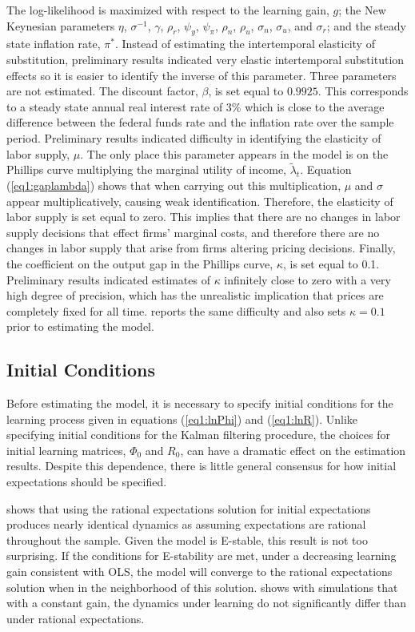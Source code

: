 The log-likelihood is maximized with respect to the learning gain, $g$; the New Keynesian parameters $\eta$, $\sigma^{-1}$, $\gamma$, $\rho_r$, $\psi_y$, $\psi_{\pi}$, $\rho_n$, $\rho_u$, $\sigma_n$, $\sigma_u$, and $\sigma_r$; and the steady state inflation rate, $\pi^*$.  Instead of estimating the intertemporal elasticity of substitution, preliminary results indicated very elastic intertemporal substitution effects so it is easier to identify the inverse of this parameter.  Three parameters are not estimated.  The discount factor, $\beta$, is set equal to $0.9925$.  This corresponds to a steady state annual real interest rate of 3\% which is close to the average difference between the federal funds rate and the inflation rate over the sample period.  Preliminary results indicated difficulty in identifying the elasticity of labor supply, $\mu$.  The only place this parameter appears in the model is on the Phillips curve multiplying the marginal utility of income, $\tilde{\lambda}_t$.  Equation (\ref{eq1:gaplambda}) shows that when carrying out this multiplication, $\mu$ and $\sigma$ appear multiplicatively, causing weak identification.  Therefore, the elasticity of labor supply is set equal to zero.  This implies that there are no changes in labor supply decisions that effect firms' marginal costs, and therefore there are no changes in labor supply that arise from firms altering pricing decisions.  Finally, the coefficient on the output gap in the Phillips curve, $\kappa$, is set equal to 0.1.  Preliminary results indicated estimates of $\kappa$ infinitely close to zero with a very high degree of precision, which has the unrealistic implication that prices are completely fixed for all time.   reports the same difficulty and also sets $\kappa=0.1$ prior to estimating the model.

\subsection{Initial Conditions}
Before estimating the model, it is necessary to specify initial conditions for the learning process given in equations (\ref{eq1:lnPhi}) and (\ref{eq1:lnR}).  Unlike specifying initial conditions for the Kalman filtering procedure, the choices for initial learning matrices, $\Phi_0$ and $R_{0}$, can have a dramatic effect on the estimation results.  Despite this dependence, there is little general consensus for how initial expectations should be specified.

 shows that using the rational expectations solution for initial expectations produces nearly identical dynamics as assuming expectations are rational throughout the sample.  Given the model is E-stable, this result is not too surprising.  If the conditions for E-stability are met, under a decreasing learning gain consistent with OLS, the model will converge to the rational expectations solution when in the neighborhood of this solution.   shows with simulations that with a constant gain, the dynamics under learning do not significantly differ than under rational expectations.

